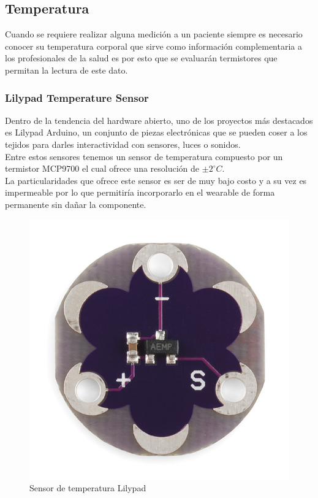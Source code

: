 \subsection{Temperatura}
Cuando se requiere realizar alguna medición a un paciente siempre es necesario conocer su temperatura corporal que sirve como información complementaria a los profesionales de la salud es por esto que se evaluarán termistores que permitan la lectura de este dato.
\subsubsection{Lilypad Temperature Sensor}
Dentro de la tendencia del hardware abierto, uno de los proyectos más destacados es Lilypad Arduino, un conjunto de piezas electrónicas que se pueden coser a los tejidos para darles interactividad con sensores, luces o sonidos.\\
Entre estos sensores tenemos un sensor de temperatura compuesto por un termistor MCP9700 el cual ofrece una resolución de $\pm2^\circ C.$\\

\newpage
La particularidades que ofrece este sensor es ser de muy bajo costo y a su vez es impermeable por lo que permitiría incorporarlo en el wearable de forma permanente sin dañar la componente.

\begin{figure}[H]
\centering
\includegraphics[scale=0.7]{figuras/sensor/t/lilypad.jpg}
\caption{Sensor de temperatura Lilypad}
\label{Lilypad}
\end{figure}

